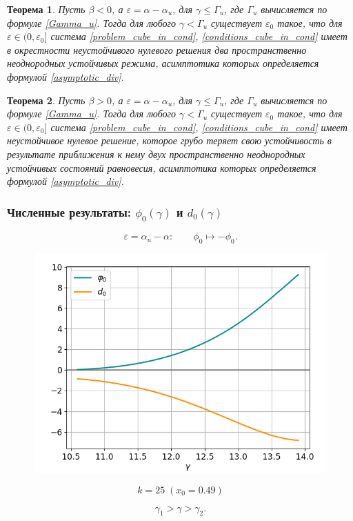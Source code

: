 \documentclass[fullscreen=true, unicode, bookmarks=false]{beamer}
\newtheorem{rustheorem}{Теорема }
\begin{document}
\begin{frame}

\begin{rustheorem}
Пусть $\beta<0$, а $\varepsilon = \alpha - \alpha_u$, для $\gamma \leqslant \Gamma_u$, где $\Gamma_u$ вычисляется по формуле \eqref{Gamma_u}. Тогда для любого $\gamma < \Gamma_u$ существует $\varepsilon_0$ такое, что для $\varepsilon \in (0, \varepsilon_0]$ система \eqref{problem_cube_in_cond}, \eqref{conditions_cube_in_cond} имеет в окрестности неустойчивого нулевого решения два пространственно неоднородных устойчивых режима, асимптотика которых определяется формулой \eqref{asymptotic_div}.
\end{rustheorem}
\begin{rustheorem}
Пусть $\beta>0$, а $\varepsilon = \alpha - \alpha_u$, для $\gamma \leqslant \Gamma_u$, где $\Gamma_u$ вычисляется по формуле \eqref{Gamma_u}. Тогда для любого $\gamma < \Gamma_u$ существует $\varepsilon_0$ такое, что для $\varepsilon \in (0, \varepsilon_0]$ система \eqref{problem_cube_in_cond}, \eqref{conditions_cube_in_cond} имеет неустойчивое нулевое решение, которое грубо теряет свою устойчивость в результате приближения к нему двух пространственно неоднородных устойчивых состояний равновесия, асимптотика которых определяется формулой \eqref{asymptotic_div}.
\end{rustheorem}

\end{frame}

\begin{frame}
\frametitle{ Численные результаты: $ \phi_0(\gamma) $ и $ d_0(\gamma) $ }

$$ \varepsilon = \alpha_u - \alpha: \qquad \phi_0 \longmapsto -\phi_0. $$

\vfill

\begin{figure}[h]
\includegraphics[scale=0.4]{divergent_phi0d0_049_P.png} 
\end{figure}
$$ k=25 \; (x_0=0.49) $$

\vfill

$$ \gamma_1 > \gamma > \gamma_2. $$

\end{frame}
\end{document}

